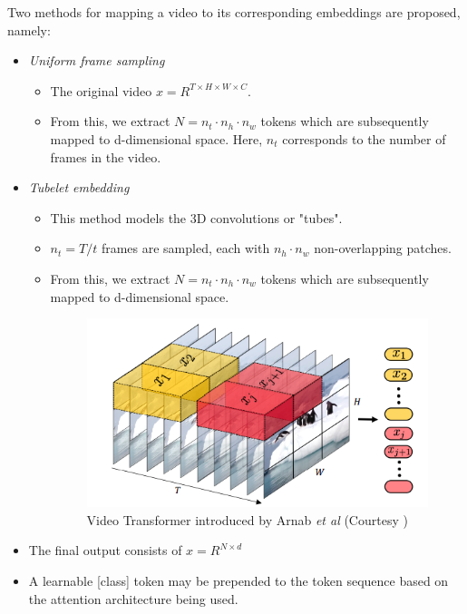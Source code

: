 \par Two methods for mapping a video to its corresponding embeddings are proposed, namely:
\begin{itemize}
    \item \textit{Uniform frame sampling}
    \begin{itemize}
        \item The original video $x = R^{T \times H \times W \times C}$.
        \item From this, we extract $N = n_t \cdot n_h \cdot n_w$ tokens which are subsequently mapped to d-dimensional space. Here, $n_t$ corresponds to the number of frames in the video.
    \end{itemize} 
    \item \textit{Tubelet embedding}
    \begin{itemize}
        \item This method models the 3D convolutions or "tubes".
        \item $n_t = T/t$ frames are sampled, each with $n_h \cdot n_w$ non-overlapping patches.
        \item From this, we extract $N = n_t \cdot n_h \cdot n_w$ tokens which are subsequently mapped to d-dimensional space.

        \begin{figure}
            \centering
            \includegraphics[width=\linewidth]{assets/img/vivit-tublet-embed.png}
            \caption{Video Transformer introduced by Arnab \textit{et al} (Courtesy \cite{vivit})}
        \end{figure}

    \end{itemize} 
    \item The final output consists of $x = R^{N \times d}$
    \item A learnable [class] token may be prepended to the token sequence based on the attention architecture being used.
\end{itemize}
\par

